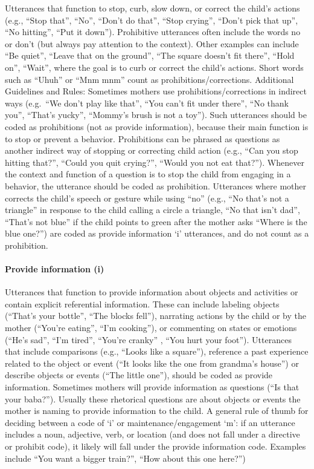 \documentclass[
]{book}
\begin{document}
Utterances that function to stop, curb, slow down, or correct the child's actions (e.g., ``Stop that'', ``No'', ``Don't do that'', ``Stop crying'', ``Don't pick that up'', ``No hitting'', ``Put it down''). Prohibitive utterances often include the words no or don't (but always pay attention to the context). Other examples can include ``Be quiet'', ``Leave that on the ground'', ``The square doesn't fit there'', ``Hold on'', ``Wait'', where the goal is to curb or correct the child's actions. Short words such as ``Uhuh'' or ``Mnm mnm'' count as prohibitions/corrections.
Additional Guidelines and Rules:
Sometimes mothers use prohibitions/corrections in indirect ways (e.g.~``We don't play like that'',
``You can't fit under there'', ``No thank you'', ``That's yucky'', ``Mommy's brush is not a toy''). Such utterances should be coded as prohibitions (not as provide information), because their main function is to stop or prevent a behavior.
Prohibitions can be phrased as questions as another indirect way of stopping or correcting child action (e.g., ``Can you stop hitting that?'', ``Could you quit crying?'', ``Would you not eat that?''). Whenever the context and function of a question is to stop the child from engaging in a behavior, the utterance should be coded as prohibition.
Utterances where mother corrects the child's speech or gesture while using ``no'' (e.g., ``No that's not a triangle'' in response to the child calling a circle a triangle, ``No that isn't dad'', ``That's not blue'' if the child points to green after the mother asks ``Where is the blue one?'') are coded as provide information `i' utterances, and do not count as a prohibition.

\hypertarget{provide_info}{%
\paragraph*{Provide information (i)}\label{provide_info}}

Utterances that function to provide information about objects and activities or contain explicit referential information. These can include labeling objects (``That's your bottle'', ``The blocks fell''), narrating actions by the child or by the mother (``You're eating'', ``I'm cooking''), or commenting on states or emotions (``He's sad'', ``I'm tired'', ``You're cranky'' , ``You hurt your foot''). Utterances that include comparisons (e.g., ``Looks like a square''), reference a past experience related to the object or event (``It looks like the one from grandma's house'') or describe objects or events (``The little one''), should be coded as provide information. Sometimes mothers will provide information as questions (``Is that your baba?''). Usually these rhetorical questions are about objects or events the mother is naming to provide information to the child.
A general rule of thumb for deciding between a code of `i' or maintenance/engagement `m': if an utterance includes a noun, adjective, verb, or location (and does not fall under a directive or prohibit code), it likely will fall under the provide information code. Examples include ``You want a bigger train?'', ``How about this one here?'')
\end{document}
